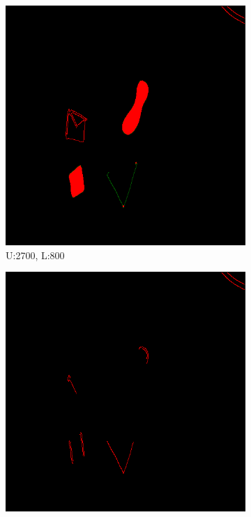 \documentclass[11pt]{article}
\begin{document}
\begin{figure}[H]
	
	\begin{subfigure}[t]{.25\textwidth}
		\centering
		\includegraphics[scale=0.3]{pics/normalThreshTest/Upper2700lower800kernel5.png}
		\caption{U:2700, L:800}
	\end{subfigure}
\hfill
	\begin{subfigure}[t]{.25\textwidth}
		\centering
		\includegraphics[scale=0.3]{pics/normalThreshTest/Upper2700lower1400kernel5.png}

\end{subfigure}
\end{figure}
\end{document}
